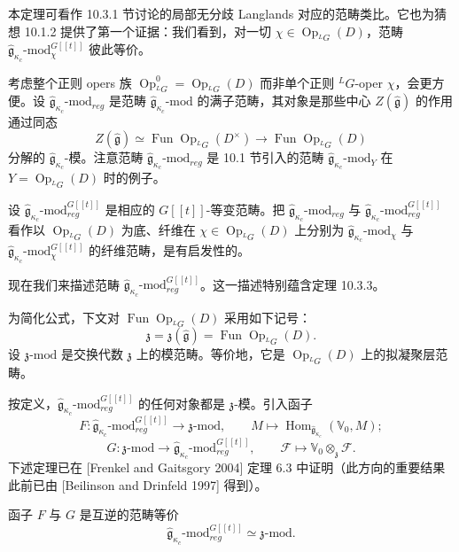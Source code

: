 本定理可看作 10.3.1 节讨论的局部无分歧 Langlands 对应的范畴类比。它也为猜想 10.1.2 提供了第一个证据：我们看到，对一切 $\chi\in\operatorname{Op}_{{}^LG}(D)$，范畴 $\hat{\mathfrak{g}}_{\kappa_c}\text{-mod}^{G[[t]]}_\chi$ 彼此等价。

考虑整个正则 opers 族 $\operatorname{Op}^0_{{}^LG}=\operatorname{Op}_{{}^LG}(D)$ 而非单个正则 ${}^LG$-oper $\chi$，会更方便。设 $\hat{\mathfrak{g}}_{\kappa_c}\text{-mod}_{reg}$ 是范畴 $\hat{\mathfrak{g}}_{\kappa_c}\text{-mod}$ 的满子范畴，其对象是那些中心 $Z(\hat{\mathfrak{g}})$ 的作用通过同态
\[
    Z(\hat{\mathfrak{g}})\simeq\operatorname{Fun}\operatorname{Op}_{{}^LG}(D^\times)
    \to\operatorname{Fun}\operatorname{Op}_{{}^LG}(D)
\]
分解的 $\hat{\mathfrak{g}}_{\kappa_c}$-模。注意范畴 $\hat{\mathfrak{g}}_{\kappa_c}\text{-mod}_{reg}$ 是 10.1 节引入的范畴 $\hat{\mathfrak{g}}_{\kappa_c}\text{-mod}_Y$ 在 $Y=\operatorname{Op}_{{}^LG}(D)$ 时的例子。

设 $\hat{\mathfrak{g}}_{\kappa_c}\text{-mod}^{G[[t]]}_{reg}$ 是相应的 $G[[t]]$-等变范畴。把 $\hat{\mathfrak{g}}_{\kappa_c}\text{-mod}_{reg}$ 与 $\hat{\mathfrak{g}}_{\kappa_c}\text{-mod}^{G[[t]]}_{reg}$ 看作以 $\operatorname{Op}_{{}^LG}(D)$ 为底、纤维在 $\chi\in\operatorname{Op}_{{}^LG}(D)$ 上分别为 $\hat{\mathfrak{g}}_{\kappa_c}\text{-mod}_\chi$ 与 $\hat{\mathfrak{g}}_{\kappa_c}\text{-mod}^{G[[t]]}_\chi$ 的纤维范畴，是有启发性的。

现在我们来描述范畴 $\hat{\mathfrak{g}}_{\kappa_c}\text{-mod}^{G[[t]]}_{reg}$。这一描述特别蕴含定理 10.3.3。

为简化公式，下文对 $\operatorname{Fun}\operatorname{Op}_{{}^LG}(D)$ 采用如下记号：
\[
    \mathfrak{z}=\mathfrak{z}(\hat{\mathfrak{g}})=\operatorname{Fun}\operatorname{Op}_{{}^LG}(D).
\]
设 $\mathfrak{z}\text{-mod}$ 是交换代数 $\mathfrak{z}$ 上的模范畴。等价地，它是 $\operatorname{Op}_{{}^LG}(D)$ 上的拟凝聚层范畴。

按定义，$\hat{\mathfrak{g}}_{\kappa_c}\text{-mod}^{G[[t]]}_{reg}$ 的任何对象都是 $\mathfrak{z}$-模。引入函子
\[
    F:\hat{\mathfrak{g}}_{\kappa_c}\text{-mod}^{G[[t]]}_{reg}\to\mathfrak{z}\text{-mod},
    \qquad M\mapsto\operatorname{Hom}_{\hat{\mathfrak{g}}_{\kappa_c}}(\mathbb{V}_0,M);
\]
\[
    G:\mathfrak{z}\text{-mod}\to\hat{\mathfrak{g}}_{\kappa_c}\text{-mod}^{G[[t]]}_{reg},
    \qquad \mathcal{F}\mapsto\mathbb{V}_0\otimes_{\mathfrak{z}}\mathcal{F}.
\]
下述定理已在 [Frenkel and Gaitsgory 2004] 定理 6.3 中证明（此方向的重要结果此前已由 [Beilinson and Drinfeld 1997] 得到）。

\begin{theorem}
    函子 $F$ 与 $G$ 是互逆的范畴等价
    \begin{equation}
        \hat{\mathfrak{g}}_{\kappa_c}\text{-mod}^{G[[t]]}_{reg}\simeq\mathfrak{z}\text{-mod}.
        \tag{10.3-9}
    \end{equation}
\end{theorem}

